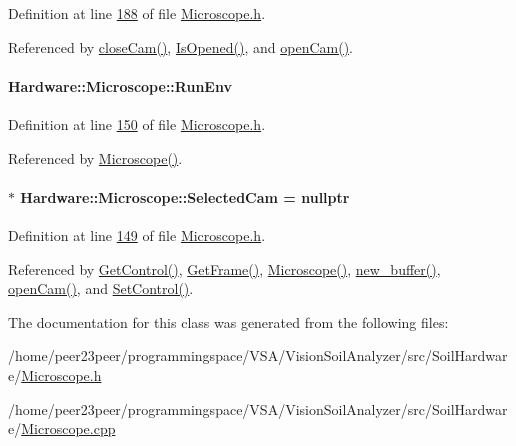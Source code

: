 Definition at line \hyperlink{_microscope_8h_source_l00188}{188} of file \hyperlink{_microscope_8h_source}{Microscope.\+h}.



Referenced by \hyperlink{_microscope_8cpp_source_l00311}{close\+Cam()}, \hyperlink{_microscope_8cpp_source_l00165}{Is\+Opened()}, and \hyperlink{_microscope_8cpp_source_l00167}{open\+Cam()}.

\hypertarget{class_hardware_1_1_microscope_a544911a6d1eec986001087e5d9278604}{}
\paragraph[{Run\+Env}]{ Hardware\+::\+Microscope\+::\+Run\+Env}\label{class_hardware_1_1_microscope_a544911a6d1eec986001087e5d9278604}


Definition at line \hyperlink{_microscope_8h_source_l00150}{150} of file \hyperlink{_microscope_8h_source}{Microscope.\+h}.



Referenced by \hyperlink{_microscope_8cpp_source_l00012}{Microscope()}.

\hypertarget{class_hardware_1_1_microscope_a059d62ec28e85f1c3f3225c9c78a877f}{}
\paragraph[{Selected\+Cam}]{$\ast$ Hardware\+::\+Microscope\+::\+Selected\+Cam = nullptr}\label{class_hardware_1_1_microscope_a059d62ec28e85f1c3f3225c9c78a877f}


Definition at line \hyperlink{_microscope_8h_source_l00149}{149} of file \hyperlink{_microscope_8h_source}{Microscope.\+h}.



Referenced by \hyperlink{_microscope_8cpp_source_l00364}{Get\+Control()}, \hyperlink{_microscope_8cpp_source_l00319}{Get\+Frame()}, \hyperlink{_microscope_8cpp_source_l00021}{Microscope()}, \hyperlink{_microscope_8cpp_source_l00413}{new\+\_\+buffer()}, \hyperlink{_microscope_8cpp_source_l00167}{open\+Cam()}, and \hyperlink{_microscope_8cpp_source_l00374}{Set\+Control()}.



The documentation for this class was generated from the following files\+:\begin{DoxyCompactItemize}
\item 
/home/peer23peer/programmingspace/\+V\+S\+A/\+Vision\+Soil\+Analyzer/src/\+Soil\+Hardware/\hyperlink{_microscope_8h}{Microscope.\+h}\item 
/home/peer23peer/programmingspace/\+V\+S\+A/\+Vision\+Soil\+Analyzer/src/\+Soil\+Hardware/\hyperlink{_microscope_8cpp}{Microscope.\+cpp}\end{DoxyCompactItemize}
